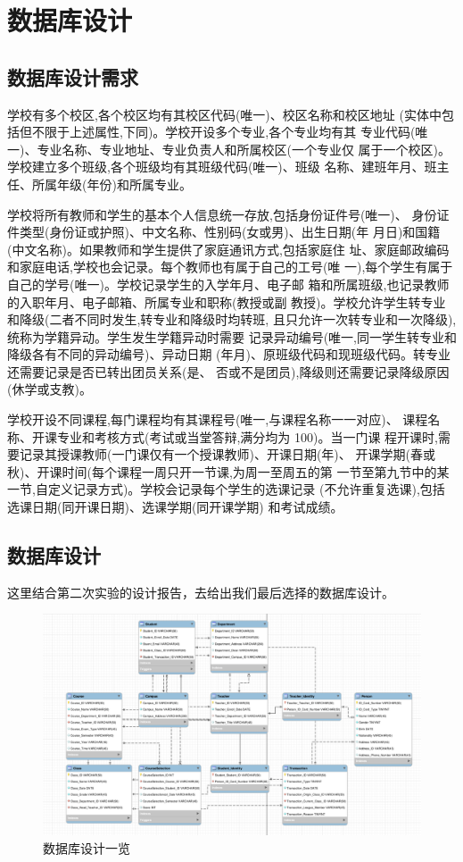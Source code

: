 \documentclass[../report.tex]{subfiles}
\begin{document}
\section {数据库设计}

\subsection {数据库设计需求}

学校有多个校区,各个校区均有其校区代码(唯一)、校区名称和校区地址
(实体中包括但不限于上述属性,下同)。学校开设多个专业,各个专业均有其
专业代码(唯一)、专业名称、专业地址、专业负责人和所属校区(一个专业仅
属于一个校区)。学校建立多个班级,各个班级均有其班级代码(唯一)、班级
名称、建班年月、班主任、所属年级(年份)和所属专业。

学校将所有教师和学生的基本个人信息统一存放,包括身份证件号(唯一)、
身份证件类型(身份证或护照)、中文名称、性别码(女或男)、出生日期(年
月日)和国籍(中文名称)。如果教师和学生提供了家庭通讯方式,包括家庭住
址、家庭邮政编码和家庭电话,学校也会记录。每个教师也有属于自己的工号(唯
一),每个学生有属于自己的学号(唯一)。学校记录学生的入学年月、电子邮
箱和所属班级,也记录教师的入职年月、电子邮箱、所属专业和职称(教授或副
教授)。学校允许学生转专业和降级(二者不同时发生,转专业和降级时均转班,
且只允许一次转专业和一次降级),统称为学籍异动。学生发生学籍异动时需要
记录异动编号(唯一,同一学生转专业和降级各有不同的异动编号)、异动日期
(年月)、原班级代码和现班级代码。转专业还需要记录是否已转出团员关系(是、
否或不是团员),降级则还需要记录降级原因(休学或支教)。

学校开设不同课程,每门课程均有其课程号(唯一,与课程名称一一对应)、
课程名称、开课专业和考核方式(考试或当堂答辩,满分均为 100)。当一门课
程开课时,需要记录其授课教师(一门课仅有一个授课教师)、开课日期(年)、
开课学期(春或秋)、开课时间(每个课程一周只开一节课,为周一至周五的第
一节至第九节中的某一节,自定义记录方式)。学校会记录每个学生的选课记录
(不允许重复选课),包括选课日期(同开课日期)、选课学期(同开课学期)
和考试成绩。

\subsection {数据库设计}

这里结合第二次实验的设计报告，去给出我们最后选择的数据库设计。

\begin{figure}
\centering
\includegraphics[width=1\linewidth]{../figure/database-design.png}
\caption{数据库设计一览}
\label{fig:database-design}
\end{figure}
\end{document}
